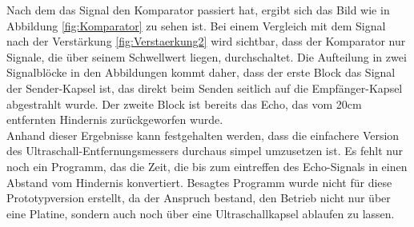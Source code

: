 Nach dem das Signal den Komparator passiert hat, ergibt sich das Bild wie in Abbildung \ref{fig:Komparator} zu sehen ist. Bei einem Vergleich mit dem Signal nach der Verstärkung \ref{fig:Verstaerkung2} wird sichtbar, dass der Komparator nur Signale, die über seinem Schwellwert liegen, durchschaltet. Die Aufteilung in zwei Signalblöcke in den Abbildungen kommt daher, dass der erste Block das Signal der Sender-Kapsel ist, das direkt beim Senden seitlich auf die Empfänger-Kapsel abgestrahlt wurde. Der zweite Block ist bereits das Echo, das vom 20cm entfernten Hindernis zurückgeworfen wurde.\\
Anhand dieser Ergebnisse kann festgehalten werden, dass die einfachere Version des Ultraschall-Entfernungsmessers durchaus simpel umzusetzen ist. Es fehlt nur noch ein Programm, das die Zeit, die bis zum eintreffen des Echo-Signals in einen Abstand vom Hindernis konvertiert. Besagtes Programm wurde nicht für diese Prototypversion erstellt, da der Anspruch bestand, den Betrieb nicht nur über eine Platine, sondern auch noch über eine Ultraschallkapsel ablaufen zu lassen.
\newpage
